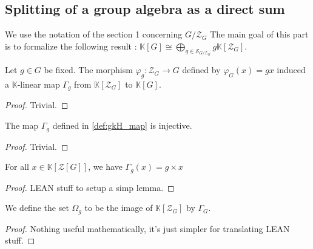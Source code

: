 \subsection{Splitting of a group algebra as a direct sum}

We use the notation of the section 1 concerning $G/\mathcal{Z}_G$
The main goal of this part is to formalize the following result :
$\mathbb{K}[G] \cong \bigoplus\limits_{g\in \mathcal{S}_{G/\mathcal{Z}_G} } g \mathbb{K}[\mathcal{Z}_G]$.

\begin{definition}
    \label{def:gkH_map}
    \leanok
    Let $g\in G$ be fixed. The morphism $\varphi_g : \mathcal{Z}_G\rightarrow G$ defined by
    $\varphi_G(x)=gx$ induced a $\mathbb{K}$-linear map $\Gamma_g$ from $\mathbb{K}[\mathcal{Z}_G]$ to $\mathbb{K}[G]$.
    \begin{proof}    
        \leanok
        Trivial.
    \end{proof}
\end{definition}

\begin{proposition}
    \label{prop:gkH_map_Injective}
    \leanok
    The map $\Gamma_g$ defined in \ref{def:gkH_map} is injective.
\end{proposition}
\begin{proof}
    \leanok
    Trivial.
\end{proof}

\begin{proposition}
    \label{prop:gkH_map_eq}
    \leanok
    For all $x\in\mathbb{K}[\mathcal{Z}[G]]$, we have $\Gamma_g(x)=g\times x$
\end{proposition}
\begin{proof}
    \leanok
    LEAN stuff to setup a simp lemma.
\end{proof}

\begin{definition}
    \label{def:gkH_set}
    \leanok
    We define the set $\Omega_g$ to be the image of $\mathbb{K}[\mathcal{Z}_G]$
    by $\Gamma_G$.
    \begin{proof}    
        \leanok
        Nothing useful mathematically, it's just simpler for translating LEAN stuff.
    \end{proof}
\end{definition}

